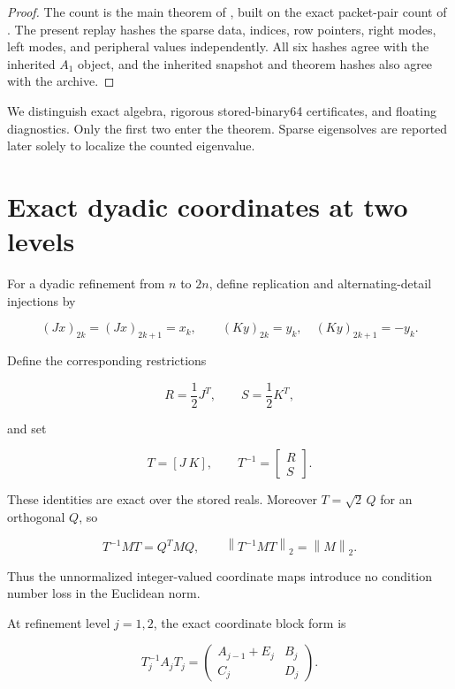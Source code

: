 \documentclass[11pt]{article}
\theoremstyle{definition}
\theoremstyle{remark}
\newcommand{\norm}[1]{\left\lVert #1\right\rVert}
\begin{document}
\begin{proof}
The count is the main theorem of \citet{WangNested2026}, built on the exact
packet-pair count of \citet{WangPacketPair2026}.  The present replay hashes the
sparse data, indices, row pointers, right modes, left modes, and peripheral
values independently.  All six hashes agree with the inherited $A_1$
object, and the inherited snapshot and theorem hashes also agree with the
archive.
\end{proof}

We distinguish exact algebra, rigorous stored-binary64 certificates, and
floating diagnostics.  Only the first two enter the theorem.  Sparse
eigensolves are reported later solely to localize the counted eigenvalue.

\section{Exact dyadic coordinates at two levels}
\label{sec:coordinates}

For a dyadic refinement from $n$ to $2n$, define replication and
alternating-detail injections by

\[
(Jx)_{2k}=(Jx)_{2k+1}=x_k,
\qquad
(Ky)_{2k}=y_k,\quad (Ky)_{2k+1}=-y_k.
\]

Define the corresponding restrictions

\[
R=\frac12J^T,\qquad S=\frac12K^T,
\]

and set

\[
T=[J\ K],\qquad T^{-1}=\begin{bmatrix}R\\S\end{bmatrix}.
\]

These identities are exact over the stored reals.  Moreover
$T=\sqrt2\,Q$ for an orthogonal $Q$, so

\begin{equation}
 T^{-1}MT=Q^TMQ,\qquad \norm{T^{-1}MT}_2=\norm{M}_2.
 \label{eq:norm-invariance}
\end{equation}

Thus the unnormalized integer-valued coordinate maps introduce no condition
number loss in the Euclidean norm.

At refinement level $j=1,2$, the exact coordinate block form is

\begin{equation}
 T_j^{-1}A_jT_j=
 \begin{pmatrix}
 A_{j-1}+E_j & B_j\\
 C_j & D_j
 \end{pmatrix}.
 \label{eq:block-form}
\end{equation}
\end{document}
